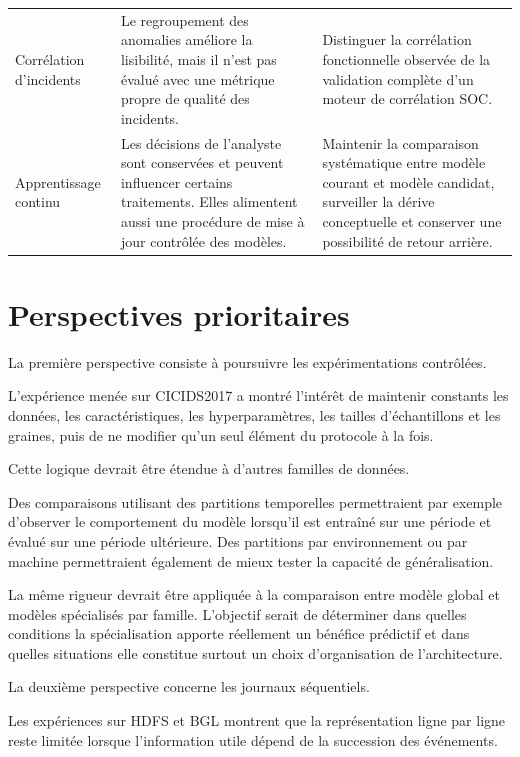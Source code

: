 \begin{table}[H]
\begin{tabularx}{\textwidth}{p{3.2cm}X X}
Corrélation d'incidents &
Le regroupement des anomalies améliore la lisibilité, mais il n'est pas évalué avec une métrique propre de qualité des incidents. &
Distinguer la corrélation fonctionnelle observée de la validation complète d'un moteur de corrélation SOC.
\tabularnewline

Apprentissage continu &
Les décisions de l'analyste sont conservées et peuvent influencer certains traitements. Elles alimentent aussi une procédure de mise à jour contrôlée des modèles. &
Maintenir la comparaison systématique entre modèle courant et modèle candidat, surveiller la dérive conceptuelle et conserver une possibilité de retour arrière.
\tabularnewline

\bottomrule
\end{tabularx}
\end{table}

\section{Perspectives prioritaires}

La première perspective consiste à poursuivre les expérimentations contrôlées.

L'expérience menée sur CICIDS2017 a montré l'intérêt de maintenir constants les données, les caractéristiques, les hyperparamètres, les tailles d'échantillons et les graines, puis de ne modifier qu'un seul élément du protocole à la fois.

Cette logique devrait être étendue à d'autres familles de données.

Des comparaisons utilisant des partitions temporelles permettraient par exemple d'observer le comportement du modèle lorsqu'il est entraîné sur une période et évalué sur une période ultérieure. Des partitions par environnement ou par machine permettraient également de mieux tester la capacité de généralisation.

La même rigueur devrait être appliquée à la comparaison entre modèle global et modèles spécialisés par famille. L'objectif serait de déterminer dans quelles conditions la spécialisation apporte réellement un bénéfice prédictif et dans quelles situations elle constitue surtout un choix d'organisation de l'architecture.

La deuxième perspective concerne les journaux séquentiels.

Les expériences sur HDFS et BGL montrent que la représentation ligne par ligne reste limitée lorsque l'information utile dépend de la succession des événements.

